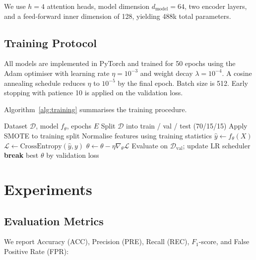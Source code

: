 \documentclass[conference]{IEEEtran}
\begin{document}
We use $h = 4$ attention heads, model dimension $d_{\text{model}} = 64$,
two encoder layers, and a feed-forward inner dimension of 128, yielding
488k total parameters.

\subsection{Training Protocol}

All models are implemented in PyTorch and trained for 50 epochs using
the Adam optimiser with learning rate $\eta = 10^{-3}$ and weight decay
$\lambda = 10^{-4}$. A cosine annealing schedule reduces $\eta$ to
$10^{-5}$ by the final epoch. Batch size is 512. Early stopping with
patience 10 is applied on the validation loss.

Algorithm~\ref{alg:training} summarises the training procedure.

\begin{algorithm}
	\caption{Model Training Procedure}
	\label{alg:training}
	\begin{algorithmic}[1]
		\REQUIRE Dataset $\mathcal{D}$, model $f_\theta$, epochs $E$
		\STATE Split $\mathcal{D}$ into train / val / test (70/15/15)
		\STATE Apply SMOTE to training split
		\STATE Normalise features using training statistics
		\STATE $\hat{y} \leftarrow f_\theta(X)$
		\STATE $\mathcal{L} \leftarrow \text{CrossEntropy}(\hat{y}, y)$
		\STATE $\theta \leftarrow \theta - \eta \nabla_\theta \mathcal{L}$
		\ENDFOR
		\STATE Evaluate on $\mathcal{D}_{\text{val}}$; update LR scheduler
		\STATE \textbf{break}
		\ENDIF
		\ENDFOR
		\RETURN best $\theta$ by validation loss
	\end{algorithmic}
\end{algorithm}

\section{Experiments}
\label{sec:experiments}

\subsection{Evaluation Metrics}

We report Accuracy (ACC), Precision (PRE), Recall (REC),
$F_1$-score, and False Positive Rate (FPR):
\end{document}
